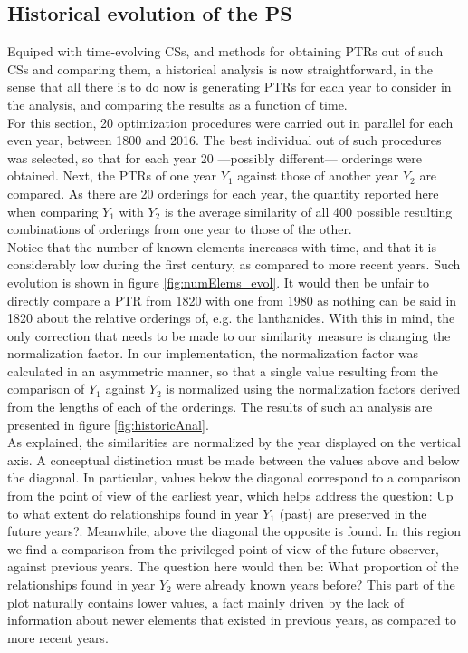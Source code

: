 \documentclass[article]{article}
\begin{document}
\subsection{Historical evolution of the PS}

Equiped with time-evolving CSs, and methods for obtaining PTRs out of such CSs and comparing them, a historical analysis is now straightforward, in the sense that all there is to do now is generating PTRs for each year to consider in the analysis, and comparing the results as a function of time.\\

For this section, 20 optimization procedures were carried out in parallel for each even year, between 1800 and 2016. The best individual out of such procedures was selected, so that for each year 20 ---possibly different--- orderings were obtained. Next, the PTRs of one year $Y_1$ against those of another year $Y_2$ are compared. As there are 20 orderings for each year, the quantity reported here when comparing $Y_1$ with $Y_2$ is the average similarity of all 400 possible resulting combinations of orderings from one year to those of the other. \\

Notice that the number of known elements increases with time, and that it is considerably low during the first century, as compared to more recent years. Such evolution is shown in figure \ref{fig:numElems_evol}. It would then be unfair to directly compare a PTR from 1820 with one from 1980 as nothing can be said in 1820 about the relative orderings of, e.g. the lanthanides. With this in mind, the only correction that needs to be made to our similarity measure is changing the normalization factor. In our implementation, the normalization factor was calculated in an asymmetric manner, so that a single value resulting from the comparison of $Y_1$ against $Y_2$ is normalized using the normalization factors derived from the lengths of each of the orderings. The results of such an analysis are presented in figure \ref{fig:historicAnal}. \\

As explained, the similarities are normalized by the year displayed on the vertical axis. A conceptual distinction must be made between the values above and below the diagonal. In particular, values below the diagonal correspond to a comparison from the point of view of the earliest year, which helps address the question: Up to what extent do relationships found in year $Y_1$ (past) are preserved in the future years?. Meanwhile, above the diagonal the opposite is found. In this region we find a comparison from the privileged point of view of the future observer, against previous years. The question here would then be: What proportion of the relationships found in year $Y_2$ were already known years before? This part of the plot naturally contains lower values, a fact mainly driven by the lack of information about newer elements that existed in previous years, as compared to more recent years.\\
\end{document}
